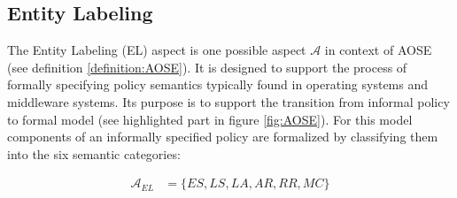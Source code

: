 \documentclass[twoside, openright, 12pt]{book}
\begin{document}
\subsection{Entity Labeling}
\label{EL}
The Entity Labeling (EL) aspect is one possible aspect $\mathcal{A}$ in context of AOSE (see definition \ref{definition:AOSE}).
It is designed to support the process of formally specifying policy semantics typically found in operating systems and middleware systems.
Its purpose is to support the transition from informal policy to formal model (see highlighted part in figure \ref{fig:AOSE}).
For this model components of an informally specified policy are formalized by classifying them into the six semantic categories:

\begin{align}
\mathcal{A}_{\mathit{EL}} &= \lbrace \mathit{ES}, \mathit{LS}, \mathit{LA}, \mathit{AR}, \mathit{RR}, \mathit{MC} \rbrace
\label{EL_A}
\end{align}
\end{document}

